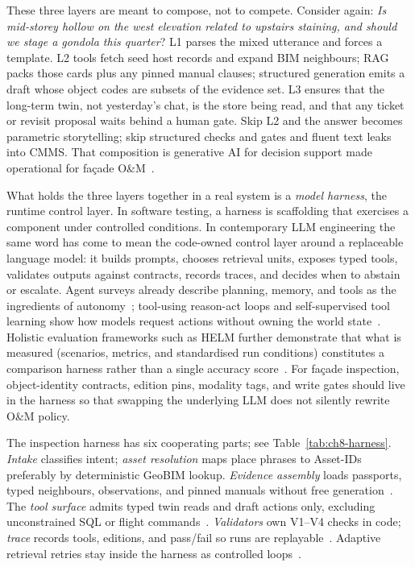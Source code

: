 These three layers are meant to compose, not to compete. Consider again: \emph{Is mid-storey hollow on the west elevation related to upstairs staining, and should we stage a gondola this quarter}? L1 parses the mixed utterance and forces a template. L2 tools fetch seed host records and expand BIM neighbours; RAG packs those cards plus any pinned manual clauses; structured generation emits a draft whose object codes are subsets of the evidence set. L3 ensures that the long-term twin, not yesterday's chat, is the store being read, and that any ticket or revisit proposal waits behind a human gate. Skip L2 and the answer becomes parametric storytelling; skip structured checks and gates and fluent text leaks into CMMS. That composition is generative AI for decision support made operational for fa\c{c}ade O\&M~\cite{lewis2020,yao2023react,ji2023}.

What holds the three layers together in a real system is a \emph{model harness}, the runtime control layer. In software testing, a harness is scaffolding that exercises a component under controlled conditions. In contemporary LLM engineering the same word has come to mean the code-owned control layer around a replaceable language model: it builds prompts, chooses retrieval units, exposes typed tools, validates outputs against contracts, records traces, and decides when to abstain or escalate. Agent surveys already describe planning, memory, and tools as the ingredients of autonomy~\cite{wang2024surveyagents,li2024surveymultiagent}; tool-using reason-act loops and self-supervised tool learning show how models request actions without owning the world state~\cite{yao2023react,schick2023toolformer}. Holistic evaluation frameworks such as HELM further demonstrate that what is measured (scenarios, metrics, and standardised run conditions) constitutes a comparison harness rather than a single accuracy score~\cite{liang2023helm}. For fa\c{c}ade inspection, object-identity contracts, edition pins, modality tags, and write gates should live in the harness so that swapping the underlying LLM does not silently rewrite O\&M policy.

The inspection harness has six cooperating parts; see Table~\ref{tab:ch8-harness}. \emph{Intake} classifies intent; \emph{asset resolution} maps place phrases to Asset-IDs preferably by deterministic GeoBIM lookup. \emph{Evidence assembly} loads passports, typed neighbours, observations, and pinned manuals without free generation~\cite{lewis2020,peng2024}. The \emph{tool surface} admits typed twin reads and draft actions only, excluding unconstrained SQL or flight commands~\cite{gao2026ifcagent,luo2025llmdtrobot}. \emph{Validators} own V1--V4 checks in code; \emph{trace} records tools, editions, and pass/fail so runs are replayable~\cite{ji2023,liang2023helm}. Adaptive retrieval retries stay inside the harness as controlled loops~\cite{asai2024selfrag,jeong2024adaptive}.

